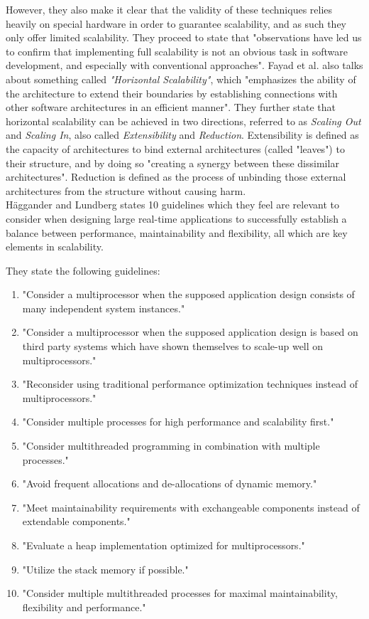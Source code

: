 \documentclass{article}
\begin{document}
However, they also make it clear that the validity of these techniques relies
heavily on special hardware in order to guarantee scalability, and as such they
only offer limited scalability. They proceed to state that "observations have led
us to confirm that implementing full scalability is not an obvious task in software
development, and especially with conventional approaches".
Fayad et al. also talks about something called \emph{"Horizontal Scalability"},
which "emphasizes the ability of the architecture to extend their boundaries by
establishing connections with other software architectures in an efficient
manner".  They further state that horizontal scalability can be achieved in two
directions, referred to as \emph{Scaling Out} and \emph{Scaling In}, also
called \emph{Extensibility} and \emph{Reduction}.  Extensibility is defined as
the capacity of architectures to bind external architectures (called "leaves")
to their structure, and by doing so "creating a synergy between these
dissimilar architectures".  Reduction is defined as the process of unbinding
those external architectures from the structure without causing harm.
\\

Häggander and Lundberg\cite{haggander1999guidelines} states 10 guidelines which
they feel are relevant to consider when designing large real-time applications
to successfully establish a balance between performance, maintainability and
flexibility, all which are key elements in scalability. 

They state the following guidelines:
\begin{enumerate}
\item{"Consider a multiprocessor when the supposed application design consists
of many independent system instances."}
\item{"Consider a multiprocessor when the supposed application design is based on
third party systems which have shown themselves to scale-up well on 
multiprocessors."}
\item{"Reconsider using traditional performance optimization techniques instead
of multiprocessors."}
\item{"Consider multiple processes for high performance and scalability first."}
\item{"Consider multithreaded programming in combination with multiple processes."}
\item{"Avoid frequent allocations and de-allocations of dynamic memory."}
\item{"Meet maintainability requirements with exchangeable components instead
 of extendable components."}
\item{"Evaluate a heap implementation optimized for multiprocessors."}
\item{"Utilize the stack memory if possible."}
\item{"Consider multiple multithreaded processes for maximal maintainability, 
flexibility and performance."}
\end{enumerate}
\end{document}
